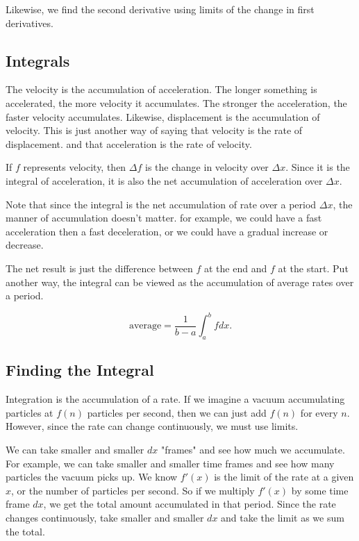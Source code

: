 \documentclass[../main.tex]{subfiles}
\begin{document}


Likewise, we find the second derivative using limits of the change in first derivatives.






\subsection{Integrals}

The velocity is the accumulation of acceleration.
The longer something is accelerated, the more velocity it accumulates.
The stronger the acceleration, the faster velocity accumulates.
Likewise, displacement is the accumulation of velocity.
This is just another way of saying that velocity is the rate of displacement.
and that acceleration is the rate of velocity.



If \( f \) represents velocity,
then \( \Delta f \) is the change in velocity over \( \Delta x \).
Since it is the integral of acceleration,
it is also the net accumulation of acceleration over \( \Delta x \).

Note that since the integral is the net accumulation of rate over a period \( \Delta x \),
the manner of accumulation doesn't matter.
for example, we could have a fast acceleration then a fast deceleration,
or we could have a gradual increase or decrease.




The net result is just the difference between \( f \) at the end and \( f \) at the start.
Put another way,
the integral can be viewed as the accumulation of average rates over a period.

\[ \text{average} = \frac{1}{b - a} \int_a^b f dx. \]


\subsection{Finding the Integral}

Integration is the accumulation of a rate.
If we imagine a vacuum accumulating particles at \( f(n) \) particles per second,
then we can just add \( f(n) \) for every \( n \).
However, since the rate can change continuously,
we must use limits.

We can take smaller and smaller \( dx \) "frames"
and see how much we accumulate.
For example,
we can take smaller and smaller time frames and see how many particles the vacuum picks up.
We know \( f'(x) \) is the limit of the rate at a given \( x \),
or the number of particles per second.
So if we multiply \( f'(x) \) by some time frame \( dx \),
we get the total amount accumulated in that period.
Since the rate changes continuously,
take smaller and smaller \( dx \) and take the limit as we sum the total.
\end{document}
